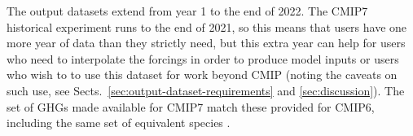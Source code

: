 The output datasets extend from year 1 to the end of 2022.
The CMIP7 historical experiment runs to the end of 2021,
so this means that users have one more year of data than they strictly need,
but this extra year can help for users who need to interpolate the forcings in order to produce model inputs
or users who wish to to use this dataset for work beyond CMIP
(noting the caveats on such use, see Sects.~\ref{sec:output-dataset-requirements} and \ref{sec:discussion}).
The set of GHGs made available for CMIP7 match these provided for CMIP6,
including the same set of equivalent species \citep{meinshausen_historical-ghgs_2017}.
